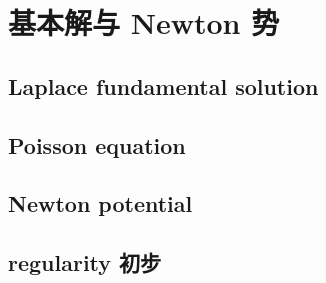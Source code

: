 \section{基本解与 Newton 势}
\label{b2:sec:1303}


\subsection{Laplace fundamental solution}
\label{b2:subsec:130301}

\subsection{Poisson equation}
\label{b2:subsec:130302}

\subsection{Newton potential}
\label{b2:subsec:130303}

\subsection{regularity 初步}
\label{b2:subsec:130304}


